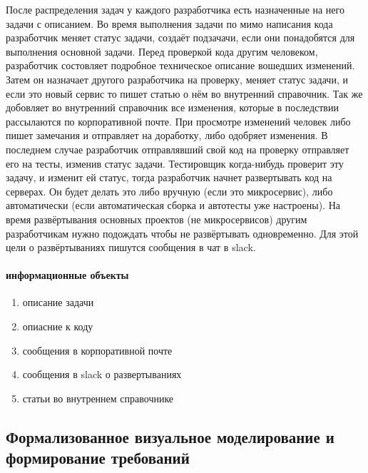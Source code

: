 \documentclass{article}
\begin{document}
После распределения задач у каждого разработчика есть назначенные на него задачи с описанием.
Во время выполнения задачи по мимо написания кода разработчик меняет статус задачи,
создаёт подзачачи, если они понадобятся для выполнения основной задачи.
Перед проверкой кода другим человеком, разработчик состовляет подробное техническое описание
вошедших изменений. Затем он назначает другого разработчика на проверку,
меняет статус задачи, и если это новый сервис то пишет статью о нём во внутренний справочник.
Так же добовляет во внутренний справочник все изменения,
которые в последствии рассылаются по корпоративной почте.
При просмотре изменений человек либо пишет замечания и отправляет на доработку,
либо одобряет изменения. В последнем случае разработчик отправлявший свой код на проверку
отправляет его на тесты, изменив статус задачи. Тестировщик когда-нибудь проверит эту задачу,
и изменит ей статус, тогда разработчик начнет развертывать код на серверах.
Он будет делать это либо вручную (если это микросервис), 
либо автоматически (если автоматическая сборка и автотесты уже настроены).
На время развёртывания основных проектов (не микросервисов) другим разработчикам нужно подождать
чтобы не развёртывать одновременно. Для этой цели о развёртываниях пишутся сообщения в чат в slack.
\cite{wiki}

\paragraph{информационные объекты}
\begin{enumerate}
    \item{описание задачи}
    \item{опиасние к коду}
    \item{сообщения в корпоративной почте}
    \item{сообщения в slack о развертываниях}
    \item{статьи во внутреннем справочнике}
\end{enumerate}


\pagebreak


\subsection{Формализованное визуальное моделирование и формирование требований}
\end{document}
